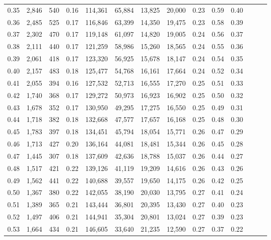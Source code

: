\begin{tabular}{rrrrrrrrrrrrrr}
0.35 &  2,846 &  540 &  0.16 &  114,361 &   65,884 &  13,825 &  20,000 &  0.23 &  0.59 &      0.40 \\
0.36 &  2,485 &  525 &  0.17 &  116,846 &   63,399 &  14,350 &  19,475 &  0.23 &  0.58 &      0.39 \\
0.37 &  2,302 &  470 &  0.17 &  119,148 &   61,097 &  14,820 &  19,005 &  0.24 &  0.56 &      0.37 \\
0.38 &  2,111 &  440 &  0.17 &  121,259 &   58,986 &  15,260 &  18,565 &  0.24 &  0.55 &      0.36 \\
0.39 &  2,061 &  418 &  0.17 &  123,320 &   56,925 &  15,678 &  18,147 &  0.24 &  0.54 &      0.35 \\
0.40 &  2,157 &  483 &  0.18 &  125,477 &   54,768 &  16,161 &  17,664 &  0.24 &  0.52 &      0.34 \\
0.41 &  2,055 &  394 &  0.16 &  127,532 &   52,713 &  16,555 &  17,270 &  0.25 &  0.51 &      0.33 \\
0.42 &  1,740 &  368 &  0.17 &  129,272 &   50,973 &  16,923 &  16,902 &  0.25 &  0.50 &      0.32 \\
0.43 &  1,678 &  352 &  0.17 &  130,950 &   49,295 &  17,275 &  16,550 &  0.25 &  0.49 &      0.31 \\
0.44 &  1,718 &  382 &  0.18 &  132,668 &   47,577 &  17,657 &  16,168 &  0.25 &  0.48 &      0.30 \\
0.45 &  1,783 &  397 &  0.18 &  134,451 &   45,794 &  18,054 &  15,771 &  0.26 &  0.47 &      0.29 \\
0.46 &  1,713 &  427 &  0.20 &  136,164 &   44,081 &  18,481 &  15,344 &  0.26 &  0.45 &      0.28 \\
0.47 &  1,445 &  307 &  0.18 &  137,609 &   42,636 &  18,788 &  15,037 &  0.26 &  0.44 &      0.27 \\
0.48 &  1,517 &  421 &  0.22 &  139,126 &   41,119 &  19,209 &  14,616 &  0.26 &  0.43 &      0.26 \\
0.49 &  1,562 &  441 &  0.22 &  140,688 &   39,557 &  19,650 &  14,175 &  0.26 &  0.42 &      0.25 \\
0.50 &  1,367 &  380 &  0.22 &  142,055 &   38,190 &  20,030 &  13,795 &  0.27 &  0.41 &      0.24 \\
0.51 &  1,389 &  365 &  0.21 &  143,444 &   36,801 &  20,395 &  13,430 &  0.27 &  0.40 &      0.23 \\
0.52 &  1,497 &  406 &  0.21 &  144,941 &   35,304 &  20,801 &  13,024 &  0.27 &  0.39 &      0.23 \\
0.53 &  1,664 &  434 &  0.21 &  146,605 &   33,640 &  21,235 &  12,590 &  0.27 &  0.37 &      0.22 \\

\end{tabular}
